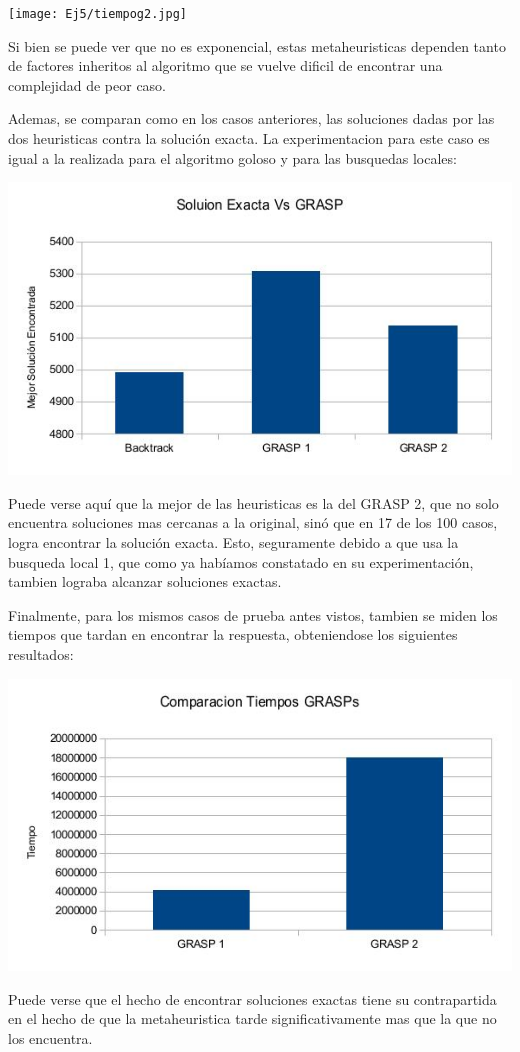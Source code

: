 \texttt{[image: Ej5/tiempog2.jpg]}

Si bien se puede ver que no es exponencial, estas metaheuristicas dependen tanto de factores inheritos al algoritmo que se vuelve dificil de encontrar una complejidad de peor caso.

Ademas, se comparan como en los casos anteriores, las soluciones dadas por las dos heuristicas contra la solución exacta. La experimentacion para este caso es igual a la realizada para el algoritmo goloso y para las busquedas locales:

\includegraphics[scale=0.5]{Ej5/graspSol.jpg}

Puede verse aquí que la mejor de las heuristicas es la del GRASP 2, que no solo encuentra soluciones mas cercanas a la original, sinó que en 17 de los 100 casos, logra encontrar la solución exacta. Esto, seguramente debido a que usa la busqueda local 1, que como ya habíamos constatado en su experimentación, tambien lograba alcanzar soluciones exactas.

Finalmente, para los mismos casos de prueba antes vistos, tambien se miden los tiempos que tardan en encontrar la respuesta, obteniendose los siguientes resultados:

\includegraphics[scale=0.5]{Ej5/tiempos.jpg}

Puede verse que el hecho de encontrar soluciones exactas tiene su contrapartida en el hecho de que la metaheuristica tarde significativamente mas que la que no los encuentra.